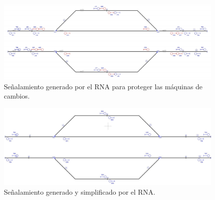     \begin{figure}[h]
        \centering
        \includegraphics[width=1\textwidth]{resultados-obtenidos/ejemplo5/images/5_step4.png}
        \centering\caption{Señalamiento generado por el RNA para proteger las máquinas de cambios.}
    \end{figure}

    \begin{figure}[h]
        \centering
        \includegraphics[width=1\textwidth]{resultados-obtenidos/ejemplo5/images/5_RNA.png}
        \centering\caption{Señalamiento generado y simplificado por el RNA.}
    \end{figure}
    
    
    
    
    